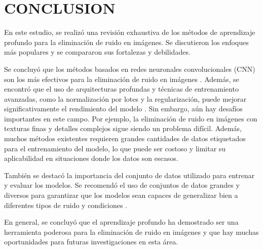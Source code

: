 \documentclass[a4paper,
               ]{jacow}
\begin{document}

\section{CONCLUSION}

En este estudio, se realizó una revisión exhaustiva de los métodos de aprendizaje profundo para la eliminación de ruido en imágenes. Se discutieron los enfoques más populares y se compararon sus fortalezas y debilidades.

Se concluyó que los métodos basados en redes neuronales convolucionales (CNN) son los más efectivos para la eliminación de ruido en imágenes \cite{zhang2017beyond, lehtinen2018noise2noise, tai2017image}. Además, se encontró que el uso de arquitecturas profundas y técnicas de entrenamiento avanzadas, como la normalización por lotes y la regularización, puede mejorar significativamente el rendimiento del modelo \cite{lefkimmiatis2018universal}. Sin embargo, aún hay desafíos importantes en este campo. Por ejemplo, la eliminación de ruido en imágenes con texturas finas y detalles complejos sigue siendo un problema difícil. Además, muchos métodos existentes requieren grandes cantidades de datos etiquetados para el entrenamiento del modelo, lo que puede ser costoso y limitar su aplicabilidad en situaciones donde los datos son escasos.

También se destacó la importancia del conjunto de datos utilizado para entrenar y evaluar los modelos. Se recomendó el uso de conjuntos de datos grandes y diversos para garantizar que los modelos sean capaces de generalizar bien a diferentes tipos de ruido y condiciones \cite{zhang2018learning}.

En general, se concluyó que el aprendizaje profundo ha demostrado ser una herramienta poderosa para la eliminación de ruido en imágenes y que hay muchas oportunidades para futuras investigaciones en esta área.
\end{document}
